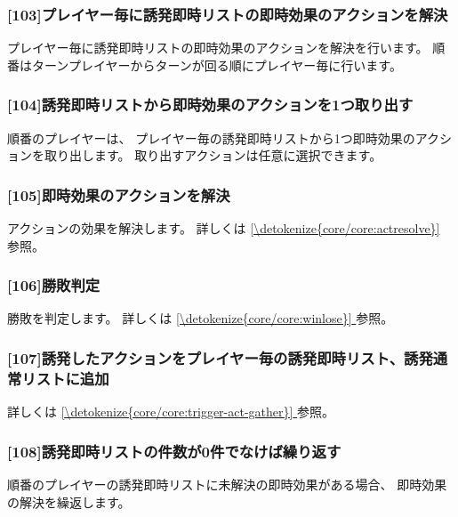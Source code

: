 \documentclass[letterpaper,10pt,dvipdfmx]{sphinxmanual}
\begin{document}
\subsubsection{{[}10\sphinxhyphen{}3{]}プレイヤー毎に誘発即時リストの即時効果のアクションを解決}
\label{\detokenize{core/core:id32}}
\sphinxAtStartPar
プレイヤー毎に誘発即時リストの即時効果のアクションを解決を行います。
順番はターンプレイヤーからターンが回る順にプレイヤー毎に行います。


\subsubsection{{[}10\sphinxhyphen{}4{]}誘発即時リストから即時効果のアクションを1つ取り出す}
\label{\detokenize{core/core:id33}}
\sphinxAtStartPar
順番のプレイヤーは、 プレイヤー毎の誘発即時リストから1つ即時効果のアクションを取り出します。
取り出すアクションは任意に選択できます。


\subsubsection{{[}10\sphinxhyphen{}5{]}即時効果のアクションを解決}
\label{\detokenize{core/core:id34}}
\sphinxAtStartPar
アクションの効果を解決します。
詳しくは \hyperref[\detokenize{core/core:actresolve}]{\ref{\detokenize{core/core:actresolve}} } 参照。


\subsubsection{{[}10\sphinxhyphen{}6{]}勝敗判定}
\label{\detokenize{core/core:id35}}
\sphinxAtStartPar
勝敗を判定します。
詳しくは \hyperref[\detokenize{core/core:winlose}]{\ref{\detokenize{core/core:winlose}} } 参照。


\subsubsection{{[}10\sphinxhyphen{}7{]}誘発したアクションをプレイヤー毎の誘発即時リスト、誘発通常リストに追加}
\label{\detokenize{core/core:id36}}
\sphinxAtStartPar
詳しくは \hyperref[\detokenize{core/core:trigger-act-gather}]{\ref{\detokenize{core/core:trigger-act-gather}} } 参照。


\subsubsection{{[}10\sphinxhyphen{}8{]}誘発即時リストの件数が0件でなけば繰り返す}
\label{\detokenize{core/core:id37}}
\sphinxAtStartPar
順番のプレイヤーの誘発即時リストに未解決の即時効果がある場合、
即時効果の解決を繰返します。
\end{document}
